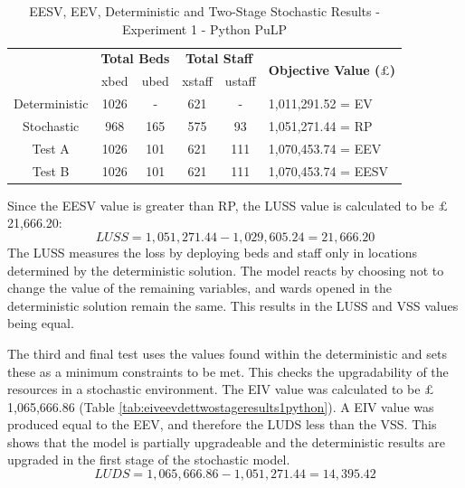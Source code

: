 \documentclass[../thesis.tex]{subfiles}
\begin{document}
\begin{table}[h!]
    \centering
    \begin{tabular}{cccccl}\toprule
 & \multicolumn{2}{l}{\textbf{Total Beds}} & \multicolumn{2}{c}{\textbf{Total Staff}} & \multirow{2}{*}{\textbf{Objective Value ($\pounds$)}}\\ \cmidrule(lr){2-3} \cmidrule(lr){4-5}
 & xbed           & ubed          & xstaff         & ustaff         \\ \midrule
      Deterministic & 1026 & - &  621 & - & 1,011,291.52 =  EV \\ \midrule
      Stochastic & 968  & 165 &  575 & 93 &1,051,271.44 = RP\\\midrule
      Test A & 1026 & 101 & 621 & 111 & 1,070,453.74 = EEV \\\midrule
      Test B & 1026 & 101 & 621 & 111 & 1,070,453.74 = EESV \\\bottomrule
    \end{tabular}
    \caption{EESV, EEV, Deterministic and Two-Stage Stochastic Results - Experiment 1 - Python PuLP}
    \label{tab:eesveevdettwostageresults1python}
\end{table}
 Since the EESV value is greater than RP, the LUSS value is calculated to be $\pounds$21,666.20:
 \begin{equation}
     LUSS = 1,051,271.44 - 1,029,605.24 = 21,666.20
 \end{equation}
The LUSS measures the loss by deploying beds and staff only in locations determined by the deterministic solution. The model reacts by choosing not to change the value of the remaining variables, and wards opened in the deterministic solution remain the same. This results in the LUSS and VSS values being equal.

The third and final test uses the values found within the deterministic and sets these as a minimum constraints to be met. This checks the upgradability of the resources in a stochastic environment. The EIV value was calculated to be $\pounds$1,065,666.86 (Table \ref{tab:eiveevdettwostageresults1python}). A EIV value was produced equal to the EEV, and therefore the LUDS less than the VSS. This shows that the model is partially upgradeable and the deterministic results are upgraded in the first stage of the stochastic model.
\begin{equation}
    LUDS =  1,065,666.86 - 1,051,271.44 = 14,395.42
\end{equation}
\end{document}
